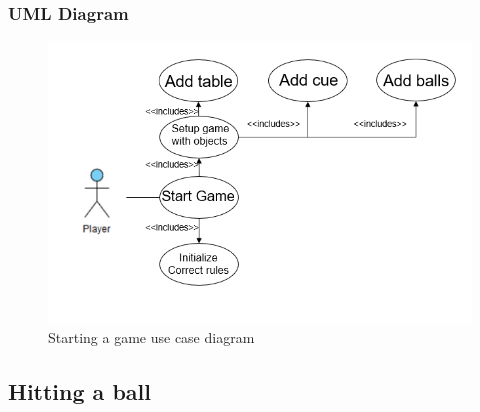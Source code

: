 \documentclass[10pt]{article}
\begin{document}
		\subsubsection{UML Diagram}
			\begin{figure}[H]
				\includegraphics[width=\linewidth]{latex_images/StartgameUseCase.png}
				\caption{Starting a game use case diagram}
			\end{figure}
			
	\subsection{Hitting a ball}
\end{document}
